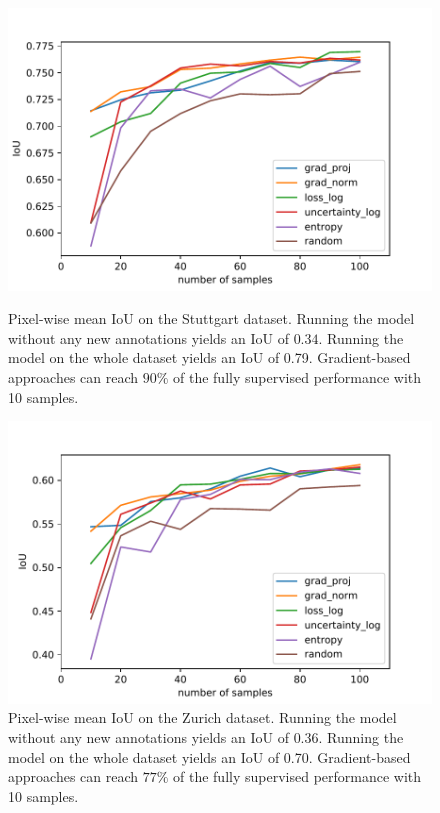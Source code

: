 \documentclass[letterpaper, 10 pt, conference]{ieeeconf}  %
\begin{document}
    \begin{figure}
    \centering
    \vspace{-1em}
    \includegraphics[width=0.9\linewidth]{pics/pw_iou_stuttgart_wentropy.pdf}
   		\caption{Pixel-wise mean IoU on the Stuttgart dataset. Running the model without any new annotations yields an IoU of $0.34$. Running the model on the whole dataset yields an IoU of 0.79. Gradient-based approaches can reach $90\%$ of the fully supervised performance with 10 samples.}
		\label{fig:iou_stuttgart}    		
    \centering
    \vspace{-0.1em}
     \includegraphics[width=0.9\linewidth]{pics/pw_iou_zurich_wentropy.pdf}
   		\caption{Pixel-wise mean IoU on the Zurich dataset. Running the model without any new annotations yields an IoU of $0.36$. Running the model on the whole dataset yields an IoU of 0.70. Gradient-based approaches can reach $77\%$ of the fully supervised performance with 10 samples.}
		\label{fig:iou_zurich}    		
    \vspace{-1.9em}
   \end{figure}
   
\end{document}
